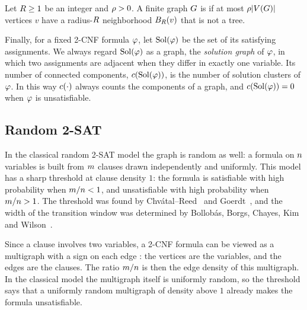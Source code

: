 \begin{definition}\label{def:loctree}
Let \(R\ge1\) be an integer and \(\rho>0\). A finite graph \(G\) is
\emph{\loctree{\rad}{\nontree}} if at most \(\rho|V(G)|\) vertices \(v\)
have a radius-\(R\) neighborhood \(B_{R}(v)\) that is not a tree.
\end{definition}

Finally, for a fixed 2-CNF formula \(\varphi\), let \(\operatorname{Sol}(\varphi)\) be the set of
its satisfying assignments. We always regard \(\operatorname{Sol}(\varphi)\) as a graph, the
\emph{solution graph} of \(\varphi\), in which two assignments are adjacent when
they differ in exactly one variable. Its number of connected components,
\(c(\operatorname{Sol}(\varphi))\), is the number of solution clusters of \(\varphi\). In this way
\(c(\cdot)\) always counts the components of a graph, and
\(c(\operatorname{Sol}(\varphi))=0\) when \(\varphi\) is unsatisfiable.

\subsection{Random 2-SAT}


In the classical random 2-SAT model the graph is random as well: a formula on
\(n\) variables is built from \(m\) clauses drawn independently and
uniformly. This model has a sharp threshold at clause density \(1\): the
formula is satisfiable with high probability when \(m/n<1\), and
unsatisfiable with high probability when \(m/n>1\). The threshold was
found by Chv\'atal--Reed~\cite{ChvatalReed1992} and Goerdt~\cite{Goerdt1996},
and the width of the transition window was determined by Bollob\'as, Borgs,
Chayes, Kim and Wilson~\cite{BBCKW2001}.

Since a clause involves two variables, a 2-CNF formula can be viewed as a
multigraph with a sign on each edge : the vertices are the variables, and the
edges are the clauses. The ratio \(m/n\) is then the edge density of
this multigraph. In the classical model the multigraph itself is uniformly
random, so the threshold says that a uniformly random multigraph of density
above \(1\) already makes the formula unsatisfiable.

